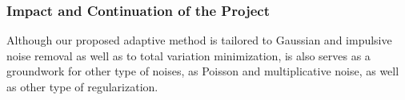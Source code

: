 \documentclass[enabledeprecatedfontcommands,cleardoublepage=empty,headsepline,twoside,11pt,DIV=15,BCOR=12mm,final]{scrartcl}
\begin{document}
 


\subsubsection*{Impact and Continuation of the Project}


Although our proposed adaptive method is tailored to Gaussian and impulsive noise removal as well as to total variation minimization, is also serves as a groundwork for other type of noises, as Poisson and multiplicative noise, as well as other type of regularization.

\end{document}
